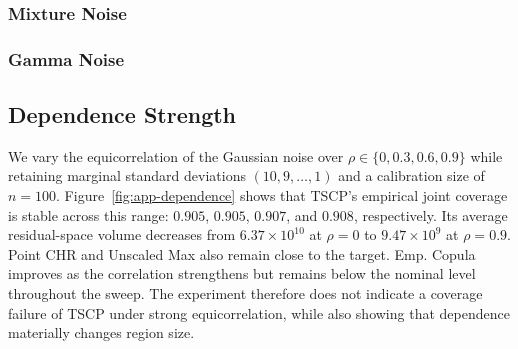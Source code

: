 \clearpage
\subsubsection*{Mixture Noise}

\begin{table}[H]
    \centering
    
    \caption{Performance of the proposed TSCP method and alternative conformal prediction approaches on simulated data with $d=10$ outcome variables, and noise following a \emph{Mixture} distribution; i.e., $\epsilon_j \sim \frac{1}{2}\mathrm{Laplace}(10-j+1)+\frac{1}{2}\mathcal{N}(0, (10-j+1)^2)$ for all $j \in [10]$. Other details are as in Table~\ref{tab:gaussian-heter}.}
    \label{tab:mixed}
\end{table}

\clearpage
\subsubsection*{Gamma Noise}
 
\begin{table}[H]
    \centering
    
    \caption{Performance of the proposed TSCP method and alternative conformal prediction approaches on simulated data with $d=10$ outcome variables, and noise following a \emph{Gamma} distribution; i.e., $\epsilon_j \sim  \mathrm{Gamma}(1, 10-j+1)$ for all $j \in [10]$. Other details are as in Table~\ref{tab:gaussian-heter}.}
    \label{tab:gamma}
  \end{table}

\FloatBarrier
\subsection{Dependence Strength}
\label{app:dependence-sensitivity}

We vary the equicorrelation of the Gaussian noise over
$\rho\in\{0,0.3,0.6,0.9\}$ while retaining marginal standard deviations
$(10,9,\ldots,1)$ and a calibration size of $n=100$. Figure~\ref{fig:app-dependence}
shows that TSCP's empirical joint coverage is stable across this range:
$0.905$, $0.905$, $0.907$, and $0.908$, respectively. Its average
residual-space volume decreases from $6.37\times10^{10}$ at $\rho=0$ to
$9.47\times10^9$ at $\rho=0.9$. Point CHR and Unscaled Max also remain close
to the target. Emp. Copula improves as the correlation strengthens but remains
below the nominal level throughout the sweep. The experiment therefore does
not indicate a coverage failure of TSCP under strong equicorrelation, while
also showing that dependence materially changes region size.


